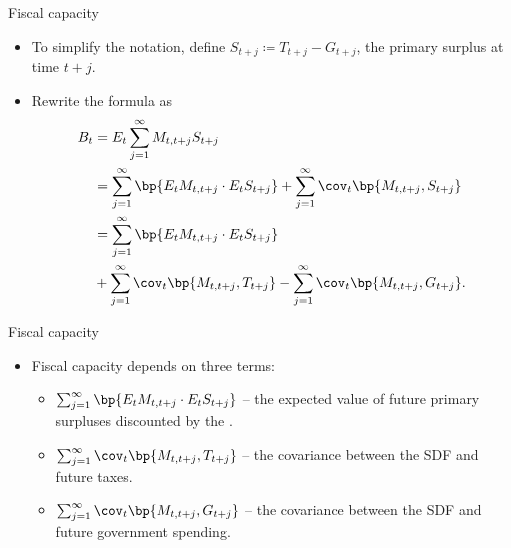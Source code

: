 \documentclass[11pt,xcolor={dvipsnames},aspectratio=159,hyperref={pdftex,pdfpagemode=UseNone,hidelinks,pdfdisplaydoctitle=true},usepdftitle=false]{beamer}
\begin{document}
\begin{frame}{Fiscal capacity}  
    \begin{itemize}
        \item To simplify the notation, define $S_{t+j}\coloneq T_{t+j}-G_{t+j}$, the primary surplus at time $t+j$.
        \item Rewrite the formula as 
        \begin{align*}
                B_t & = E_t \sum_{j=1}^\infty M_{t,t+j} S_{t+j}  \\
                & = \sum_{j=1}^\infty \bp{ E_t M_{t,t+j} \cdot E_t S_{t+j}} + \sum_{j=1}^\infty \cov_t \bp{M_{t,t+j}, S_{t+j}} \\
                & = \sum_{j=1}^\infty \bp{ E_t M_{t,t+j} \cdot E_t S_{t+j}}  \\
                &+ \sum_{j=1}^\infty \cov_t \bp{M_{t,t+j}, T_{t+j}} - \sum_{j=1}^\infty \cov_t \bp{M_{t,t+j}, G_{t+j}}.
        \end{align*}
     \end{itemize}
\end{frame}

\begin{frame}{Fiscal capacity}  
    \begin{itemize}
        \item Fiscal capacity depends on three terms:
        \begin{itemize}
        \item $\sum_{j=1}^\infty \bp{ E_t M_{t,t+j} \cdot E_t S_{t+j}}$ -- the expected value of future primary surpluses discounted by the .
        \item $\sum_{j=1}^\infty \cov_t \bp{M_{t,t+j}, T_{t+j}}$ -- the covariance between the SDF and future taxes.
        \item $\sum_{j=1}^\infty \cov_t \bp{M_{t,t+j}, G_{t+j}}$ -- the covariance between the SDF and future government spending.
        \end{itemize}
    \end{itemize}
\end{frame}
\end{document}
